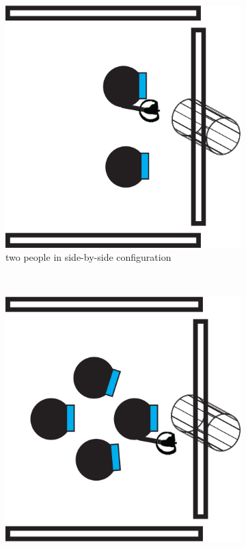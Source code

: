 \documentclass[chi_draft]{sigchi}
\begin{document}
\begin{figure}
    \centering
    \begin{subfigure}[b]{0.3\columnwidth}
        \includegraphics[width=1\columnwidth]{sbs-2}
        \caption{two people in side-by-side configuration}
        \label{fig:sbs2}
    \end{subfigure}
    ~ %
    \begin{subfigure}[b]{0.3\columnwidth}
        \includegraphics[width=1\columnwidth]{sbs-4}

\end{subfigure}
\end{figure}
\end{document}
